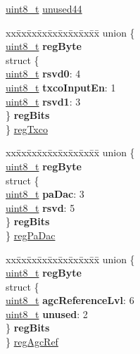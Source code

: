 \begin{DoxyCompactItemize}
\begin{tabbing}
\end{tabbing}\item 
\hyperlink{vl53l0x__types_8h_aba7bc1797add20fe3efdf37ced1182c5}{uint8\+\_\+t} \hyperlink{structFSK__Register__Map_a20fbe4738c5d1c780ea316118594d9b6}{unused44}
\item 
\begin{tabbing}
xx\=xx\=xx\=xx\=xx\=xx\=xx\=xx\=xx\=\kill
union \{\\
\>\hyperlink{vl53l0x__types_8h_aba7bc1797add20fe3efdf37ced1182c5}{uint8\_t} {\bfseries regByte}\\
\>struct \{\\
\>\>\hyperlink{vl53l0x__types_8h_aba7bc1797add20fe3efdf37ced1182c5}{uint8\_t} {\bfseries rsvd0}: 4\\
\>\>\hyperlink{vl53l0x__types_8h_aba7bc1797add20fe3efdf37ced1182c5}{uint8\_t} {\bfseries txcoInputEn}: 1\\
\>\>\hyperlink{vl53l0x__types_8h_aba7bc1797add20fe3efdf37ced1182c5}{uint8\_t} {\bfseries rsvd1}: 3\\
\>\} {\bfseries regBits}\\
\} \hyperlink{structFSK__Register__Map_a4c766ed7142f865b38ceecde61dc68f1}{regTxco}\\

\end{tabbing}\item 
\begin{tabbing}
xx\=xx\=xx\=xx\=xx\=xx\=xx\=xx\=xx\=\kill
union \{\\
\>\hyperlink{vl53l0x__types_8h_aba7bc1797add20fe3efdf37ced1182c5}{uint8\_t} {\bfseries regByte}\\
\>struct \{\\
\>\>\hyperlink{vl53l0x__types_8h_aba7bc1797add20fe3efdf37ced1182c5}{uint8\_t} {\bfseries paDac}: 3\\
\>\>\hyperlink{vl53l0x__types_8h_aba7bc1797add20fe3efdf37ced1182c5}{uint8\_t} {\bfseries rsvd}: 5\\
\>\} {\bfseries regBits}\\
\} \hyperlink{structFSK__Register__Map_a5edd85b3101352b50b4c82269901d88e}{regPaDac}\\

\end{tabbing}\item 
\begin{tabbing}
xx\=xx\=xx\=xx\=xx\=xx\=xx\=xx\=xx\=\kill
union \{\\
\>\hyperlink{vl53l0x__types_8h_aba7bc1797add20fe3efdf37ced1182c5}{uint8\_t} {\bfseries regByte}\\
\>struct \{\\
\>\>\hyperlink{vl53l0x__types_8h_aba7bc1797add20fe3efdf37ced1182c5}{uint8\_t} {\bfseries agcReferenceLvl}: 6\\
\>\>\hyperlink{vl53l0x__types_8h_aba7bc1797add20fe3efdf37ced1182c5}{uint8\_t} {\bfseries unused}: 2\\
\>\} {\bfseries regBits}\\
\} \hyperlink{structFSK__Register__Map_aacf5ba8d0ae7891acfb1f0362e286df8}{regAgcRef}\\


\end{tabbing}
\end{DoxyCompactItemize}
